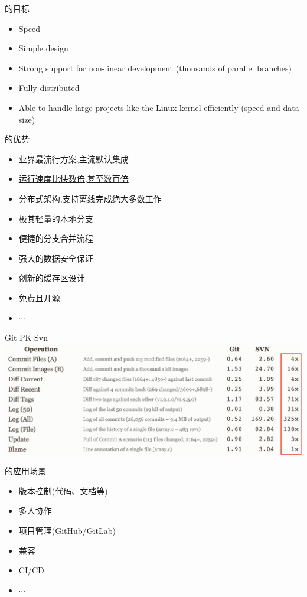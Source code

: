 \begin{frame}{的目标}
    \begin{itemize}
        \item Speed
        \item Simple design
        \item Strong support for non-linear development (thousands of parallel branches)
        \item Fully distributed
        \item Able to handle large projects like the Linux kernel efficiently (speed and data size)
    \end{itemize}
\end{frame}

\begin{frame}{的优势}
    \begin{itemize}
        \item 业界最流行方案,主流默认集成
        \item \href{https://git-scm.com/about/small-and-fast}{运行速度比快数倍,甚至数百倍}
        \item 分布式架构,支持离线完成绝大多数工作
        \item 极其轻量的本地分支
        \item 便捷的分支合并流程
        \item 强大的数据安全保证
        \item 创新的缓存区设计
        \item 免费且开源
        \item $\cdots$
    \end{itemize}
\end{frame}

\begin{frame}{Git PK Svn}
    \centering
    \includegraphics[scale=0.4]{figures/git_vs_svn.png}
\end{frame}

\begin{frame}{的应用场景}
    \begin{itemize}
        \item 版本控制(代码、文档等)
        \item 多人协作
        \item 项目管理(GitHub/GitLab)
        \item 兼容
        \item CI/CD
        \item $\cdots$
    \end{itemize}
\end{frame}